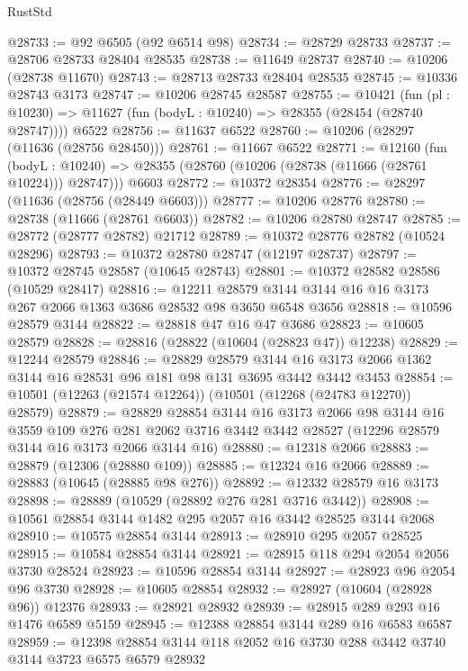 \begin{lexlean}{RustStd}
\begin{coremodule}
@28733 := @92 @6505 (@92 @6514 @98)
@28734 := @28729 @28733
@28737 := @28706 @28733 @28404 @28535
@28738 := @11649 @28737
@28740 := @10206 (@28738 @11670)
@28743 := @28713 @28733 @28404 @28535
@28745 := @10336 @28743 @3173
@28747 := @10206 @28745 @28587
@28755 := @10421
    (fun (pl : @10230) => @11627 (fun (bodyL : @10240) => @28355 (@28454 (@28740 @28747))))
    @6522
@28756 := @11637 @6522
@28760 := @10206 (@28297 (@11636 (@28756 @28450)))
@28761 := @11667 @6522
@28771 := @12160
    (fun (bodyL : @10240) => @28355 (@28760 (@10206 (@28738 (@11666 (@28761 @10224))) @28747)))
    @6603
@28772 := @10372 @28354
@28776 := @28297 (@11636 (@28756 (@28449 @6603)))
@28777 := @10206 @28776
@28780 := @28738 (@11666 (@28761 @6603))
@28782 := @10206 @28780 @28747
@28785 := @28772 (@28777 @28782) @21712
@28789 := @10372 @28776 @28782 (@10524 @28296)
@28793 := @10372 @28780 @28747 (@12197 @28737)
@28797 := @10372 @28745 @28587 (@10645 @28743)
@28801 := @10372 @28582 @28586 (@10529 @28417)
@28816 := @12211
    @28579
    @3144
    @3144
    @16
    @16
    @3173
    @267
    @2066
    @1363
    @3686
    @28532
    @98
    @3650
    @6548
    @3656
@28818 := @10596 @28579 @3144
@28822 := @28818 @47 @16 @47 @3686
@28823 := @10605 @28579
@28828 := @28816 (@28822 (@10604 (@28823 @47)) @12238)
@28829 := @12244 @28579
@28846 := @28829
    @28579
    @3144
    @16
    @3173
    @2066
    @1362
    @3144
    @16
    @28531
    @96
    @181
    @98
    @131
    @3695
    @3442
    @3442
    @3453
@28854 := @10501 (@12263 (@21574 @12264)) (@10501 (@12268 (@24783 @12270)) @28579)
@28879 := @28829
    @28854
    @3144
    @16
    @3173
    @2066
    @98
    @3144
    @16
    @3559
    @109
    @276
    @281
    @2062
    @3716
    @3442
    @3442
    @28527
    (@12296 @28579 @3144 @16 @3173 @2066 @3144 @16)
@28880 := @12318 @2066
@28883 := @28879 (@12306 (@28880 @109))
@28885 := @12324 @16 @2066
@28889 := @28883 (@10645 (@28885 @98 @276))
@28892 := @12332 @28579 @16 @3173
@28898 := @28889 (@10529 (@28892 @276 @281 @3716 @3442))
@28908 := @10561 @28854 @3144 @1482 @295 @2057 @16 @3442 @28525 @3144 @2068
@28910 := @10575 @28854 @3144
@28913 := @28910 @295 @2057 @28525
@28915 := @10584 @28854 @3144
@28921 := @28915 @118 @294 @2054 @2056 @3730 @28524
@28923 := @10596 @28854 @3144
@28927 := @28923 @96 @2054 @96 @3730
@28928 := @10605 @28854
@28932 := @28927 (@10604 (@28928 @96)) @12376
@28933 := @28921 @28932
@28939 := @28915 @289 @293 @16 @1476 @6589 @5159
@28945 := @12388 @28854 @3144 @289 @16 @6583 @6587
@28959 := @12398 @28854 @3144 @118 @2052 @16 @3730 @288 @3442 @3740 @3144 @3723 @6575 @6579 @28932

\end{coremodule}
\end{lexlean}
